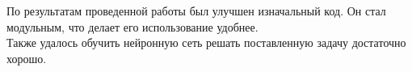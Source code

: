 \documentclass[main.tex]{subfiles}
\begin{document}
По результатам проведенной работы был улучшен изначальный код. Он стал модульным, что делает его использование удобнее.  \\
Также удалось обучить нейронную сеть решать поставленную задачу достаточно хорошо. 
\end{document}
